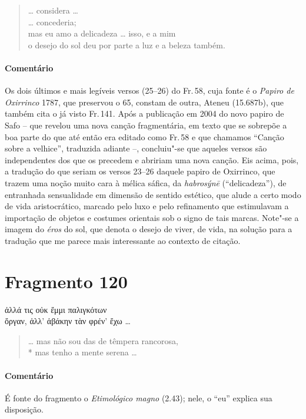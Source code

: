 \begin{verse}
\ldots{} considera \ldots{}\\
\ldots{} concederia;\\
mas eu amo a delicadeza \ldots{} isso, e a mim\\
o desejo do sol deu por parte a luz e a beleza também.
\end{verse}

{\paragraph{Comentário} Os dois últimos e mais legíveis versos (25--26) do Fr.\,58, cuja fonte é o
\textit{Papiro de Oxirrinco} 1787, que preservou o 65, constam de outra, Ateneu (15.687b), que também cita o já visto Fr.\,141. Após a publicação em 2004 do
novo papiro de Safo -- que revelou uma nova canção fragmentária, em texto que se
sobrepõe a boa parte do que até então era editado como Fr.\,58 e que chamamos ``Canção sobre a velhice'', traduzida adiante --, concluiu"-se que aqueles
versos são independentes dos que os precedem e abririam uma nova canção. Eis acima, pois, a tradução do que seriam os versos 23--26 daquele papiro de Oxirrinco, que
trazem uma noção muito cara à mélica sáfica, da \textit{habrosýnē}
(``delicadeza”), de entranhada sensualidade em dimensão de sentido
estético, que alude a certo modo de vida aristocrático, marcado pelo luxo e pelo
refinamento que estimulavam a importação de objetos e costumes orientais
sob o signo de tais marcas. Note"-se a imagem do \textit{éros} do sol, que denota o desejo de viver, de vida, na solução para a tradução que me parece mais interessante ao contexto de citação.}



\section{Fragmento 120}

\begin{gkverse}
ἀλλά τις οὐκ ἔμμι παλιγκότων\\
ὄργαν, ἀλλ’ ἀβάκην τὰν φρέν’ ἔχω \ldots{}
\end{gkverse}

\begin{verse}
\ldots{} mas não sou das de têmpera rancorosa,\\*
mas tenho a mente serena \ldots{}
\end{verse}

{\paragraph{Comentário} É fonte do fragmento o \textit{Etimológico magno} (2.43); nele, o “eu” explica sua disposição.}


